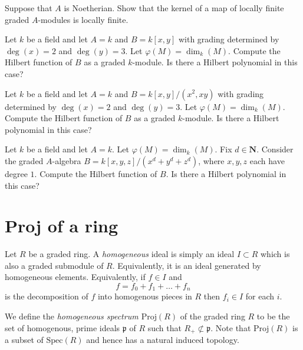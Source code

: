 \begin{exercise}
\label{exercise-kernel-locally-finite}
Suppose that $A$ is Noetherian. Show that the kernel of a map
of locally finite graded $A$-modules is locally finite.
\end{exercise}

\begin{exercise}
\label{exercise-no-hilbert}
Let $k$ be a field and let $A = k$ and $B = k[x, y]$ with grading
determined by $\deg(x) = 2$ and $\deg(y) = 3$. Let $\varphi(M) = \dim_k(M)$.
Compute the Hilbert function of $B$ as a graded $k$-module. Is there
a Hilbert polynomial in this case?
\end{exercise}

\begin{exercise}
\label{exercise-no-hilbert-or-is-there}
Let $k$ be a field and let $A = k$ and $B = k[x, y]/(x^2, xy)$ with grading
determined by $\deg(x) = 2$ and $\deg(y) = 3$. Let $\varphi(M) = \dim_k(M)$.
Compute the Hilbert function of $B$ as a graded $k$-module. Is there
a Hilbert polynomial in this case?
\end{exercise}

\begin{exercise}
\label{exercise-hilbert-to-compute}
Let $k$ be a field and let $A = k$.  Let $\varphi(M) = \dim_k(M)$.
Fix $d\in {\mathbf N}$. Consider the graded $A$-algebra
$B = k[x, y, z]/(x^d + y^d + z^d)$, where  $x, y, z$ each have degree $1$.
Compute the Hilbert function of $B$. Is there a Hilbert polynomial
in this case?
\end{exercise}



\section{Proj of a ring}
\label{section-proj-ring}

\begin{definition}
\label{definition-homogeneous-ideal}
Let $R$ be a graded ring. A {\it homogeneous} ideal is simply an ideal
$I \subset R$ which is also a graded submodule of $R$. Equivalently,
it is an ideal generated by homogeneous elements. Equivalently, if
$f \in I$ and
$$
f = f_0 + f_1 + \ldots + f_n
$$
is the decomposition of $f$ into homogenous pieces in $R$ then $f_i \in I$
for each $i$.
\end{definition}

\begin{definition}
\label{definition-Proj-R}
We define the {\it homogeneous spectrum $\text{Proj}(R)$}
of the graded ring $R$ to be the set of homogenous, prime ideals
${\mathfrak p}$ of $R$ such that $R_{+} \not \subset {\mathfrak p}$.
Note that $\text{Proj}(R)$ is a subset of $\text{Spec}(R)$ and hence has a
natural induced topology.
\end{definition}

